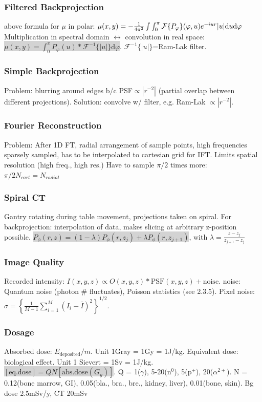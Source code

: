\documentclass[9pt]{article}
\newcommand{\grey}[1]{\setlength{\fboxsep}{0pt}\colorbox{lightgrey}{#1}}
\newcommand{\dif}{\mathrm{d}}
\newcommand{\fcal}{\mathcal{F}}
\begin{document}
\begin{multicols}{2}
\subsubsection{Filtered Backprojection} above formula for $\mu$ in polar:
$\mu(x,y) = - {1 \over 4\pi^2} \int \int_0^\pi \fcal\{P_\varphi\}(\varphi,u)e^{-iur} |u| \dif u\dif \varphi$\\
Multiplication in spectral domain $\leftrightarrow$ convolution in real space:
\grey{$\mu(x,y) = \int_0^\pi P_\varphi(u)\ast\fcal^{-1}\{|u|\}\dif \varphi$}. $\fcal^{-1}\{|u|\}$=Ram-Lak filter.

\subsubsection{Simple Backprojection} Problem: blurring around edges b/c PSF$\propto|r^{-2}|$ (partial overlap between different projections). Solution: convolve w/ filter, e.g. Ram-Lak $\propto |r^{-2}|$.

\subsubsection{Fourier Reconstruction} Problem: After 1D FT, radial arrangement of sample points, high frequencies sparsely sampled, has to be interpolated to cartesian grid for IFT. Limits spatial resolution (high freq., high res.) Have to sample $\pi /2$ times more: $\pi /2 N_{cart} = N_{radial}$

\subsubsection{Spiral CT}Gantry rotating during table movement, projections taken on spiral. For backprojection: interpolation of data, makes slicing at arbitrary z-position possible.
\grey{$P_\phi(r,z) = (1-\lambda)P_\phi(r,z_j) + \lambda P_\phi(r,z_{j+1})$}, with $\lambda=\frac{z-z_j}{z_{j+1}-z_j}$

\subsubsection{Image Quality}
Recorded intensity: $I(x,y,z)\propto O(x,y,z)\ast \mathrm{PSF}(x,y,z) + \mathrm{noise}$. noise: Quantum noise (photon \# fluctuates), Poisson statistics (see 2.3.5). Pixel noise: $\sigma = \left\{ \frac{1}{M-1}\sum_{i=1}^M(I_i - \bar{I})^2\right\}^{1/2}$.

\subsubsection{Dosage}
Absorbed dose: $E_\mathrm{deposited} / m$. Unit 1Gray = 1Gy = 1J/kg. Equivalent dose: biological effect. Unit 1 Sievert = 1Sv = 1J/kg. \grey{$[\mathrm{eq.dose}] = QN[\mathrm{abs.dose}(G_y)]$}. Q = 1($\gamma$), 5-20(n${}^0$), 5(p${}^+$), 20($\alpha^{2+}$). N = 0.12(bone marrow, GI), 0.05(bla., bra., bre., kidney, liver), 0.01(bone, skin). Bg dose 2.5mSv/y, CT 20mSv


\end{multicols}
\end{document}
